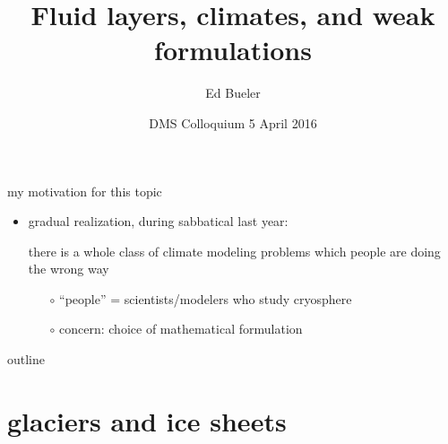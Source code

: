 \documentclass[xcolor={dvipsnames}]{beamer}
\title{Fluid layers, climates, and weak formulations}
\author{Ed Bueler}
\institute[UAF] %
{
  Dept of Mathematics and Statistics, and Geophysical Institute\\
  University of Alaska Fairbanks \\
  \tiny (\emph{funded by NASA Modeling, Analysis, and Prediction program})%
}
\date{DMS Colloquium 5 April 2016}
\begin{document}
\graphicspath{{../domains/}{../obstacle/}{../cartoon/}{../refinemass/}{../../images/}{../../../talks-public/figures/}{../../../talks-public/old/commonfigs/}{../../../../rarepos/sia-fve/talks/}}

\begin{frame}
  \titlepage
\end{frame}


\begin{frame}{my motivation for this topic}
\begin{itemize}
\item gradual realization, during sabbatical last year:
\begin{center}
\alert{there is a whole class of climate modeling problems which people are doing the wrong way}
\end{center}
  \begin{itemize}
  \item[$\circ$] ``people'' = scientists/modelers who study cryosphere
  \item[$\circ$] concern: choice of mathematical formulation
  \end{itemize}
\end{itemize}

\end{frame}


\begin{frame}{outline}
  \tableofcontents
\end{frame}


\section{glaciers and ice sheets}
\end{document}
